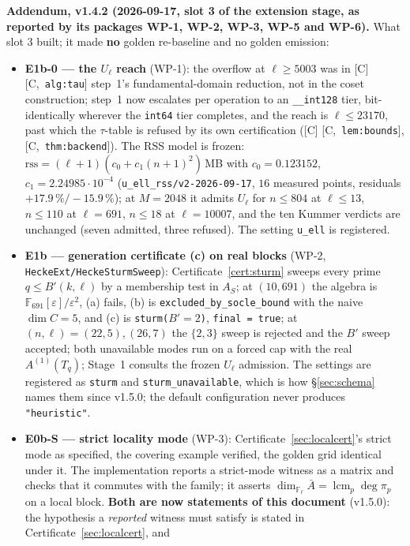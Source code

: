 \documentclass[11pt]{article}
\theoremstyle{remark}
\newcommand{\F}{\mathbb{F}}
\newcommand{\Fl}{\F_\ell}
\newcommand{\HA}[1]{[C,~\texttt{#1}]}      %
\begin{document}
\noindent\textbf{Addendum, v1.4.2 (2026-09-17, slot 3 of the extension stage, as reported by its
packages WP-1, WP-2, WP-3, WP-5 and WP-6).} What slot 3 built; it made \textbf{no} golden
re-baseline and no golden emission:
\begin{itemize}
\item \textbf{E1b-0 --- the $U_\ell$ reach} (WP-1): the overflow at $\ell\ge5003$ was in
  [C] \HA{alg:tau} step~1's fundamental-domain reduction, not in the coset construction; step~1
  now escalates per operation to an \texttt{\_\_int128} tier, bit-identically wherever the
  \texttt{int64} tier completes, and the reach is $\ell\le23170$, past which the $\tau$-table is
  refused by its own certification ([C] \HA{lem:bounds}, \HA{thm:backend}). The RSS model is
  frozen: $\mathrm{rss}=(\ell+1)(c_0+c_1(n+1)^2)$\,MB with $c_0=0.123152$,
  $c_1=2.24985\cdot10^{-4}$ (\texttt{u\_ell\_rss/v2-2026-09-17}, $16$ measured points, residuals
  $+17.9\,\%/-15.9\,\%$); at $M=2048$ it admits $U_\ell$ for $n\le804$ at $\ell\le13$, $n\le110$
  at $\ell=691$, $n\le18$ at $\ell=10007$, and the ten Kummer verdicts are unchanged (seven
  admitted, three refused). The setting \texttt{u\_ell} is registered.
\item \textbf{E1b --- generation certificate (c) on real blocks} (WP-2,
  \texttt{HeckeExt/HeckeSturmSweep}): Certificate~\ref{cert:sturm} sweeps every prime
  $q\le B'(k,\ell)$ by a membership test in $A_S$; at $(10,691)$ the algebra is
  $\F_{691}[\varepsilon]/\varepsilon^2$, (a) fails, (b) is \texttt{excluded\_by\_socle\_bound}
  with the naive $\dim C=5$, and (c) is \texttt{sturm($B'=2$)}, \texttt{final = true}; at
  $(n,\ell)=(22,5),(26,7)$ the $\{2,3\}$ sweep is rejected and the $B'$ sweep accepted; both
  unavailable modes run on a forced cap with the real $A^{(1)}(T_q)$; Stage~1 consults the
  frozen $U_\ell$ admission. The settings are registered as \texttt{sturm} and
  \texttt{sturm\_unavailable}, which is how \S\ref{sec:schema} names them since v1.5.0; the
  default configuration never produces \texttt{"heuristic"}.
\item \textbf{E0b-S --- strict locality mode} (WP-3): Certificate~\ref{sec:localcert}'s strict
  mode as specified, the covering example verified, the golden grid identical under it. The
  implementation reports a strict-mode witness as a matrix and checks that it commutes with
  the family; it asserts $\dim_{\Fl}\bar A=\operatorname{lcm}_p\deg\pi_p$ on a local block.
  \textbf{Both are now statements of this document} (v1.5.0): the hypothesis a
  \emph{reported} witness must satisfy is stated in Certificate~\ref{sec:localcert}, and

\end{itemize}
\end{document}
